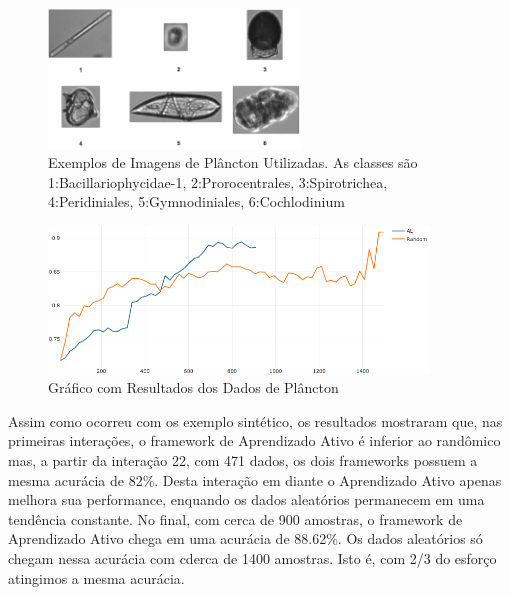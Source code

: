 \begin{figure}
  \centering
  \includegraphics[width=0.6\textwidth]{figures/Plancton_Exemplos.png}
  \caption{Exemplos de Imagens de Plâncton Utilizadas. As classes são 1:Bacillariophycidae-1, 2:Prorocentrales, 3:Spirotrichea, 4:Peridiniales, 5:Gymnodiniales, 6:Cochlodinium}
  \label{fig:Plancton_Exemplos}
\end{figure}


\begin{figure}
  \centering
  \includegraphics[width=0.9\textwidth]{figures/grafico_exemplo_plancton.png}
  \caption{Gráfico com Resultados dos Dados de Plâncton}
  \label{fig:grafico_exemplo_plancton}
\end{figure}

Assim como ocorreu com os exemplo sintético, os resultados mostraram que, nas primeiras interações, o framework de Aprendizado Ativo é inferior ao randômico mas, a partir da interação 22, com 471 dados, os dois frameworks possuem a mesma acurácia de 82\%. Desta interação em diante o Aprendizado Ativo apenas melhora sua performance, enquando os dados aleatórios permanecem em uma tendência constante. No final, com cerca de 900 amostras, o framework de Aprendizado Ativo chega em uma acurácia de 88.62\%. Os dados aleatórios só chegam nessa acurácia com cderca de 1400 amostras. Isto é, com 2/3 do esforço atingimos a mesma acurácia.